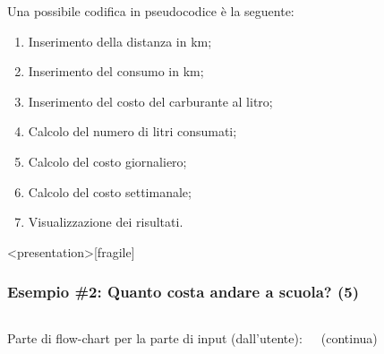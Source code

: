 \documentclass[
    notheorems,
    11pt,
    compress,
    aspectratio=169
]{beamer}
\begin{document}
\begin{frame}

    Una possibile codifica in pseudocodice è la seguente:

    \pause

    \begin{block}{}
        \begin{enumerate}
            \item Inserimento della distanza in km;
            \pause
            \item Inserimento del consumo in km;
            \pause
            \item Inserimento del costo del carburante al litro;
            \pause
            \item Calcolo del numero di litri consumati;
            \pause
            \item Calcolo del costo giornaliero;
            \pause
            \item Calcolo del costo settimanale;
            \pause
            \item Visualizzazione dei risultati.
        \end{enumerate}
    \end{block}
\end{frame}

\begin{frame}<presentation>[fragile]
    \frametitle{Esempio \#2: Quanto costa andare a scuola? (5)}

    \begin{columns}
        Parte di flow-chart per la parte di input (dall'utente):


        \begin{center}

            \vspace{\baselineskip}

            {\footnotesize (continua)}
        \end{center}
    \end{columns}
\end{frame}
\end{document}
